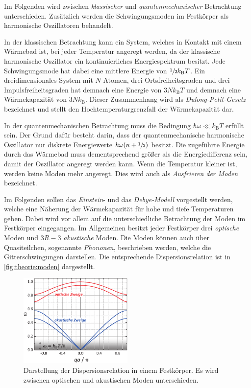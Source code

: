     Im Folgenden wird zwischen \textit{klassischer} und \textit{quantenmechanischer} Betrachtung unterschieden.
    Zusätzlich werden die Schwingungsmoden im Festkörper als harmonische Oszillatoren behandelt.

    In der klassischen Betrachtung kann ein System,
    welches in Kontakt mit einem Wärmebad ist,
    bei jeder Temperatur angeregt werden,
    da der klassische harmonische Oszillator ein kontinuierliches Energiespektrum besitzt.
    Jede Schwingungsmode hat dabei eine mittlere Energie von $\sfrac{1}{2} k_\text{B} T$.
    Ein dreidimensionales System mit $N$ Atomen,
    drei Ortsfreiheitsgraden und drei Impulsfreiheitsgraden hat demnach eine Energie von $3Nk_\text{B}T$ und demnach eine Wärmekapazität von $3Nk_\text{B}$.
    Dieser Zusammenhang wird als \textit{Dulong-Petit-Gesetz} bezeichnet und stellt den Hochtemperaturgrenzfall der Wärmekapazität dar.

    In der quantenmechanischen Betrachtung muss die Bedingung $\hbar \omega \ll k_\text{B} T$ erfüllt sein.
    Der Grund dafür besteht darin,
    dass der quantenmechanische harmonische Oszillator nur diskrete Energiewerte $\hbar \omega (n+\sfrac{1}{2})$ besitzt.
    Die zugeführte Energie durch das Wärmebad muss dementsprechend größer als die Energiedifferenz sein,
    damit der Oszillator angeregt werden kann.
    Wenn die Temperatur kleiner ist,
    werden keine Moden mehr angeregt.
    Dies wird auch als \textit{Ausfrieren der Moden} bezeichnet.

    Im Folgenden sollen das \textit{Einstein}- und das \textit{Debye-Modell} vorgestellt werden,
    welche eine Näherung der Wärmekapazität für hohe und tiefe Temperaturen geben.
    Dabei wird vor allem auf die unterschiedliche Betrachtung der Moden im Festkörper eingegangen.
    Im Allgemeinen besitzt jeder Festkörper drei \textit{optische} Moden und $3R-3$ \textit{akustische} Moden.
    Die Moden können auch über Quasiteilchen,
    sogenannte \textit{Phononen},
    beschrieben werden,
    welche die Gitterschwingungen darstellen.
    Die entsprechende Dispersionsrelation ist in \autoref{fig:theorie:moden} dargestellt.
    \begin{figure}
        \centering
        \includegraphics[width=0.5\textwidth]{content/img/Gross_Marx/6_4.pdf}
        \caption{Darstellung der Dispersionsrelation in einem Festkörper. Es wird zwischen optischen und akustischen Moden unterschieden. \cite{grossmarx}}
        \label{fig:theorie:moden}
    \end{figure}

